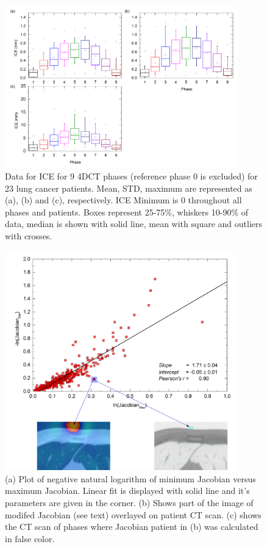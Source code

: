 \documentclass[type=dr, dr=rernat, accentcolor=tud7b,colorbacktitle, bigchapter, openright, twoside, 12pt ]{tudthesis}
\begin{document}
\begin{figure}[H]
	\begin{center}		
		\includegraphics[width=0.9\textwidth]{./Images/ICE.png}
		\caption{Data for ICE for 9 4DCT phases (reference phase 0 is excluded) for 23 lung cancer patients. Mean, STD, maximum are represented as (a), (b) and (c), respectively. ICE Minimum is 0 throughout all phases and patients.
		Boxes represent 25-75\%, whiskers 10-90\% of data, median is shown with solid line, mean with square and outliers with crosses.}
		\label{ice}
	\end{center}
\end{figure}

\begin{figure}[H]
	\begin{center}		
		\includegraphics[width=0.9\textwidth]{./Images/jacSum_lung.png}
		\caption{(a) Plot of negative natural logarithm of minimum Jacobian versus maximum Jacobian. Linear fit is displayed with solid line and it's parameters are given in the corner. (b) Shows part of the image of modifed Jacobian (see text) overlayed on patient CT scan. (c) shows the CT scan of phases where Jacobian patient in (b) was calculated in false color.}
		\label{calcJac_lung}
	\end{center}
\end{figure}
\end{document}
